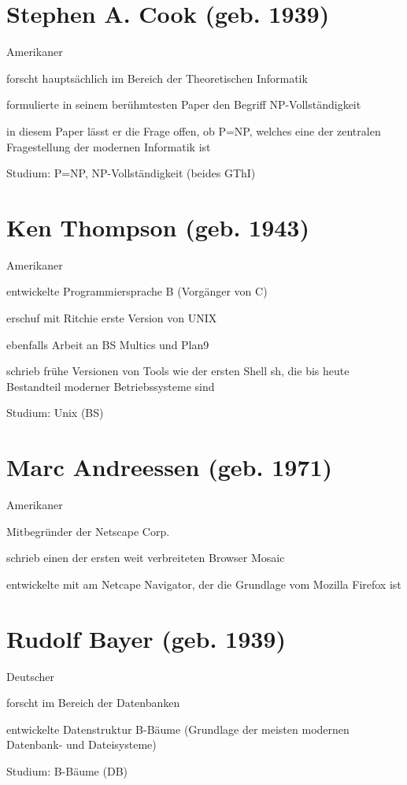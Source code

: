 \documentclass[a4paper,12pt]{report}
\begin{document}
\section{Stephen A. Cook (geb. 1939)}
\begin{itemize*}
\item Amerikaner
\item forscht hauptsächlich im Bereich der Theoretischen Informatik
\item formulierte in seinem berühmtesten Paper den Begriff NP-Vollständigkeit
\item in diesem Paper lässt er die Frage offen, ob P=NP, welches eine der zentralen Fragestellung der modernen Informatik ist
\item Studium: P=NP, NP-Vollständigkeit (beides GThI)
\end{itemize*}

\section{Ken Thompson (geb. 1943)}
\begin{itemize*}
\item Amerikaner
\item entwickelte Programmiersprache B (Vorgänger von C)
\item erschuf mit Ritchie erste Version von UNIX
\item ebenfalls Arbeit an BS Multics und Plan9
\item schrieb frühe Versionen von Tools wie der ersten Shell sh, die bis heute Bestandteil moderner Betriebssysteme sind
\item Studium: Unix (BS)
\end{itemize*}

\section{Marc Andreessen (geb. 1971)}
\begin{itemize*}
\item Amerikaner
\item Mitbegründer der Netscape Corp.
\item schrieb einen der ersten weit verbreiteten Browser Mosaic
\item entwickelte mit am Netcape Navigator, der die Grundlage vom Mozilla Firefox ist
\end{itemize*}

\section{Rudolf Bayer (geb. 1939)}
\begin{itemize*}
\item Deutscher
\item forscht im Bereich der Datenbanken
\item entwickelte Datenstruktur B-Bäume (Grundlage der meisten modernen Datenbank- und Dateisysteme)
\item Studium: B-Bäume (DB)
\end{itemize*}
\end{document}
